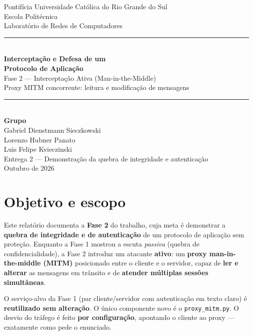 \documentclass[11pt,a4paper]{article}
\begin{document}
\begin{titlepage}
\centering
\vspace*{1.5cm}
{\large Pontifícia Universidade Católica do Rio Grande do Sul}\\[0.2cm]
{\large Escola Politécnica}\\[0.2cm]
{\large Laboratório de Redes de Computadores}\\[2.5cm]

\rule{\linewidth}{0.5mm}\\[0.5cm]
{\huge \bfseries Interceptação e Defesa de um\\ Protocolo de Aplicação}\\[0.4cm]
{\Large Fase 2 — Interceptação Ativa (Man-in-the-Middle)}\\[0.3cm]
{\large Proxy MITM concorrente: leitura e modificação de mensagens}\\
\rule{\linewidth}{0.5mm}\\[1.5cm]

{\large\bfseries Grupo}\\[0.3cm]
{\large
Gabriel Dienstmann Sieczkowski\\
Lorenzo Hubner Panato\\
Luis Felipe Kvieczinski\\
}
\vfill
{\large Entrega 2 — Demonstração da quebra de integridade e autenticação}\\[0.3cm]
{\large Outubro de 2026}
\end{titlepage}

\tableofcontents
\newpage

\section{Objetivo e escopo}

Este relatório documenta a \textbf{Fase 2} do trabalho, cuja meta é demonstrar a
\textbf{quebra de integridade e de autenticação} de um protocolo de aplicação
sem proteção. Enquanto a Fase 1 mostrou a escuta \emph{passiva} (quebra de
confidencialidade), a Fase 2 introduz um atacante \textbf{ativo}: um
\textbf{proxy man-in-the-middle (MITM)} posicionado entre o cliente e o
servidor, capaz de \textbf{ler e alterar} as mensagens em trânsito e de
\textbf{atender múltiplas sessões simultâneas}.

O serviço-alvo da Fase 1 (par cliente/servidor com autenticação em texto claro)
é \textbf{reutilizado sem alteração}. O único componente novo é o
\texttt{proxy\_mitm.py}. O desvio do tráfego é feito \textbf{por configuração},
apontando o cliente ao proxy — exatamente como pede o enunciado.
\end{document}
